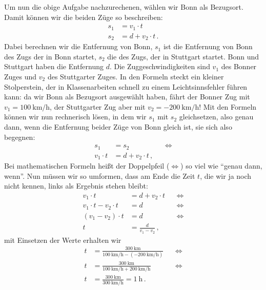 Um nun die obige Aufgabe nachzurechenen, wählen wir Bonn als Bezugsort. Damit können wir die beiden Züge so beschreiben:
\begin{equation}
    \begin{split}
        s_1 &= v_1\cdot t \\
        s_2 &= d + v_2\cdot t\,.
    \end{split}
    \label{eq:physik:bewegung:zuege}
\end{equation}
Dabei berechnen wir die Entfernung von Bonn, $s_1$ ist die Entfernung von Bonn des Zugs der in Bonn startet, $s_2$ die des Zugs, der in Stuttgart startet. Bonn und Stuttgart haben die Entfernung $d$. Die Zuggeschwindigkeiten sind $v_1$ des Bonner Zuges und $v_2$ des Stuttgarter Zuges. In den Formeln steckt ein kleiner Stolperstein, der in Klassenarbeiten schnell zu einem Leichtsinnsfehler führen kann: da wir Bonn als Bezugsort ausgewählt haben, fährt der Bonner Zug mit $v_1 = \qty{100}{\km\per\hour}$, der Stuttgarter Zug aber mit $v_2 = -\qty{200}{\km\per\hour}$! Mit den Formeln können wir nun rechnerisch lösen, in dem wir $s_1$ mit $s_2$ gleichsetzen, also genau dann, wenn die Entfernung beider Züge von Bonn gleich ist, sie sich also begegnen:
\begin{align*}
    s_1 &= s_2 && \iff\\
    v_1\cdot t &= d + v_2\cdot t\,, &&
\end{align*} 
Bei mathematischen Formeln heißt der Doppelpfeil ($\iff$) so viel wie ``genau dann, wenn''. Nun müssen wir so umformen, dass am Ende die Zeit $t$, die wir ja noch nicht kennen, links als Ergebnis stehen bleibt:
\begin{align*}
    v_1\cdot t &= d + v_2\cdot t && \iff\\
    v_1\cdot t - v_2\cdot t &= d && \iff\\
    (v_1-v_2)\cdot t &= d && \iff\\
    t &= \frac{d}{v_1-v_2}\,,
\end{align*} 
mit Einsetzen der Werte erhalten wir
\begin{align*}
    t &= \frac{\qty{300}{\km}}{\qty{100}{\km\per\hour} - (-\qty{200}{\km\per\hour})} && \iff \\
    t &= \frac{\qty{300}{\km}}{\qty{100}{\km\per\hour} + \qty{200}{\km\per\hour}} && \iff \\
    t &= \frac{\qty{300}{\km}}{\qty{300}{\km\per\hour}} = \qty{1}{\hour} \,.&&\\
\end{align*} 

